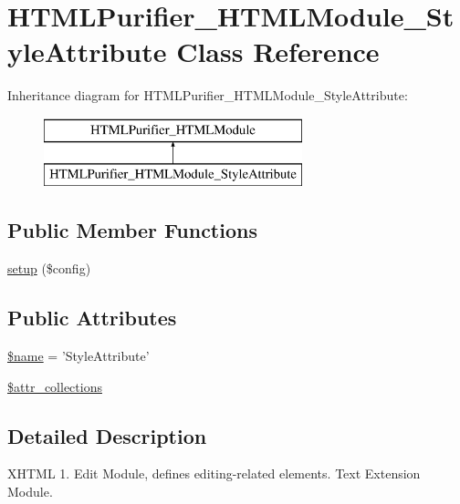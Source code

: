 \hypertarget{classHTMLPurifier__HTMLModule__StyleAttribute}{\section{H\+T\+M\+L\+Purifier\+\_\+\+H\+T\+M\+L\+Module\+\_\+\+Style\+Attribute Class Reference}
\label{classHTMLPurifier__HTMLModule__StyleAttribute}
}
Inheritance diagram for H\+T\+M\+L\+Purifier\+\_\+\+H\+T\+M\+L\+Module\+\_\+\+Style\+Attribute\+:\begin{figure}[H]
\begin{center}
\leavevmode
\includegraphics[height=2.000000cm]{classHTMLPurifier__HTMLModule__StyleAttribute}
\end{center}
\end{figure}
\subsection*{Public Member Functions}
\begin{DoxyCompactItemize}
\item 
\hyperlink{classHTMLPurifier__HTMLModule__StyleAttribute_aed74038caff9e27e2a5b176eb7b1c95b}{setup} (\$config)
\end{DoxyCompactItemize}
\subsection*{Public Attributes}
\begin{DoxyCompactItemize}
\item 
\hyperlink{classHTMLPurifier__HTMLModule__StyleAttribute_a7b36f1b21eef8336375d7a055828d63c}{\$name} = 'Style\+Attribute'
\item 
\hyperlink{classHTMLPurifier__HTMLModule__StyleAttribute_a9cde83b200c83c9d066c41795ced0599}{\$attr\+\_\+collections}
\end{DoxyCompactItemize}


\subsection{Detailed Description}
X\+H\+T\+M\+L 1. Edit Module, defines editing-\/related elements. Text Extension Module. 

